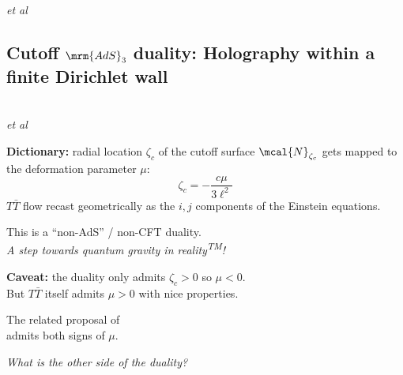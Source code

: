 \documentclass[10pt]{article}
\newcommand{\citations}[1]{{\footnotesize#1\par}}
\newcommand{\reality}{reality\textsuperscript{TM}}
\newcommand{\TTbar}{\texorpdfstring{\ensuremath{T\bar{T}}}{TTbar}\xspace}
\begin{document}
\begin{multicols}{3}
\begin{itemize}
\citations{
\textcite{Zamolodchikov:2004ce}\\
\textcite{Dubovsky:2012wk}\\
\textcite{Dubovsky:2013ira}\\
\textcite{Smirnov:2016lqw}\\
\textcite{Cavaglia:2016oda} \textit{et al}%
}

\vspace{-.8\baselineskip}

\end{itemize}

\subsection*{Cutoff $\mrm{AdS}_3$ duality:\texstringonly{\\} Holography within a finite Dirichlet wall}
\vspace{-.2\baselineskip}
\citations{
\textcite{McGough:2016lol}\\
\textcite{Kraus:2018xrn} \textit{et al}
}

\textbf{Dictionary:} radial location $\zeta_c$ of the cutoff surface $\mcal{N}_{\zeta_c}$ gets mapped to the deformation parameter $\mu$:
\begin{equation}
	\zeta_c = - \frac{c \mu}{3\ell^2}
	\label{dictionary}
\end{equation}
\TTbar flow recast geometrically as the $i,j$ components of the Einstein equations. 

This is a ``non-AdS'' / non-CFT duality.\\
\textit{A step towards quantum gravity in \reality!}

\textbf{Caveat:} the duality only admits $\zeta_c > 0$ so $\mu < 0$.\\
But \TTbar itself admits $\mu > 0$ with nice properties.

\citations{The related proposal of \textcite{Guica:2019nzm}\\
admits both signs of $\mu$.}

\textit{What is the other side of the duality?}

\columnbreak


\end{multicols}
\end{document}
